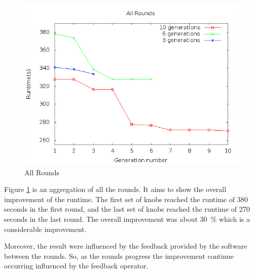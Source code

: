 \begin{figure}[htbp]
\begin{center}
	\includegraphics[scale=0.6]{graphics/img/all.png}
\caption{All Rounds} \label{fig:allgen}
\end{center}
\end{figure}

Figure \ref{fig:allgen} is an aggregation of all the rounds. It aims
to show the overall improvement of the runtime. The first set of knobs reached
the runtime of 380 seconds in the first round, and the last set of knobs reached
the runtime of 270 seconds in the last round. The overall improvement was about
30~\% which is a considerable improvement.

Moreover, the result were influenced by the feedback provided by the software
between the rounds. So, as the rounds progress the improvement continue occurring
influenced by the feedback operator.
